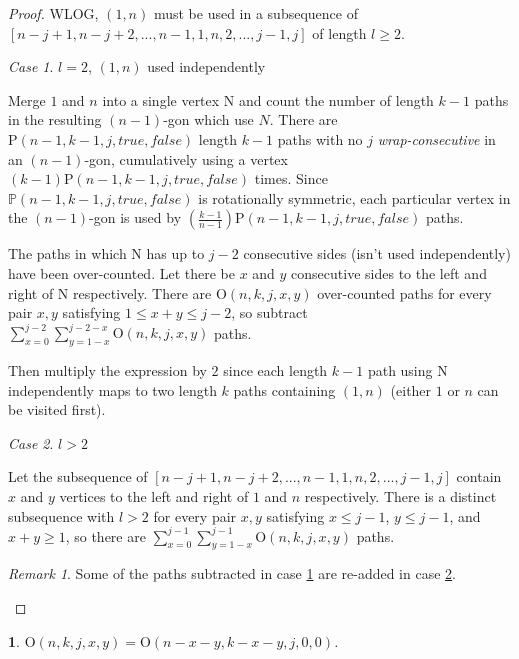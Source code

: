 \documentclass[a4paper, 12pt] {article}
\theoremstyle{remark}
\newtheorem*{remark}{Remark}
\theoremstyle{plain}
\newcommand{\thistheoremname}{}
\newtheorem{genericthm}[theorem]{\thistheoremname}
\newenvironment{namedthm}[1]
  {\renewcommand{\thistheoremname}{#1}
   \begin{genericthm}}
  {\end{genericthm}}
\theoremstyle{remark}
\newtheorem{case}{Case}
\begin{document}
\begin{proof}
WLOG, $(1,n)$ must be used in a subsequence of $[n-j+1,n-j+2,...,n-1,1,n,2,...,j-1,j]$ of length $l \geq 2$.

\begin{case} $l=2$, $(1,n)$ used independently
\label{vertex_merge_o_leq2}

Merge $1$ and $n$ into a single vertex $\mathrm{N}$ and count the number of length $k-1$ paths in the resulting $(n-1)$-gon which use $N$. There are $\mathrm{P}(n-1,k-1,j,true,false)$ length $k-1$ paths with no $j$ \textit{wrap-consecutive} in an $(n-1)$-gon, cumulatively using a vertex $(k-1) \mathrm{P}(n-1,k-1,j,true,false)$ times. Since $\mathbb{P}(n-1,k-1,j,true,false)$ is rotationally symmetric, each particular vertex in the $(n-1)$-gon is used by $\left(\frac{k-1}{n-1}\right)\mathrm{P}(n-1,k-1,j,true,false)$ paths.

The paths in which $\mathrm{N}$ has up to $j-2$ consecutive sides (isn't used independently) have been over-counted.
Let there be $x$ and $y$ consecutive sides to the left and right of $\mathrm{N}$ respectively.
There are $\mathrm{O}(n,k,j,x,y)$ over-counted paths for every pair $x, y$ satisfying $1 \leq x+y \leq j-2$, so subtract $\sum_{x=0}^{j-2} \sum_{y=1-x}^{j-2-x} \mathrm{O}(n,k,j,x,y)$ paths.

Then multiply the expression by $2$ since each length $k-1$ path using $\mathrm{N}$ independently maps to two length $k$ paths containing $(1,n)$ (either $1$ or $n$ can be visited first).
\end{case}

\begin{case} $l>2$
\label{vertex_merge_o_lg2}

Let the subsequence of $[n-j+1,n-j+2,...,n-1,1,n,2,...,j-1,j]$ contain $x$ and $y$ vertices to the left and right of $1$ and $n$ respectively. There is a distinct subsequence with $l>2$ for every pair $x, y$ satisfying $x \leq j-1$, $y \leq j-1$, and $x+y \geq 1$, so there are $\sum_{x=0}^{j-1} \sum_{y=1-x}^{j-1} \mathrm{O}(n,k,j,x,y)$ paths.
\end{case}

\begin{remark}
Some of the paths subtracted in case \ref{vertex_merge_o_leq2} are re-added in case \ref{vertex_merge_o_lg2}.
\end{remark}

\end{proof}


\begin{namedthm}{Side Removal Theorem O}
\label{side_removal_o}
$\mathrm{O}(n,k,j,x,y)=\mathrm{O}(n-x-y,k-x-y,j,0,0)$.
\end{namedthm}
\end{document}
